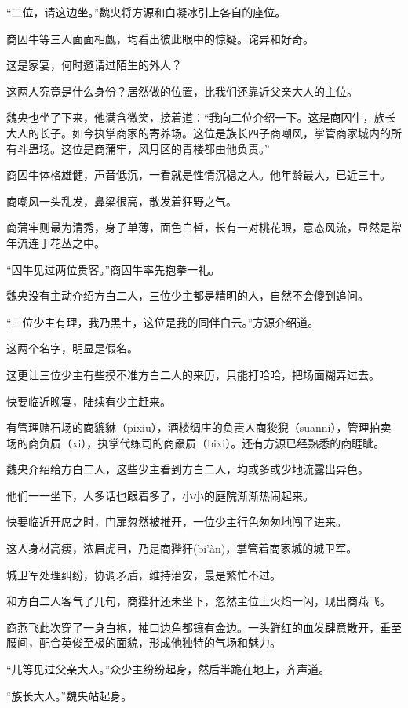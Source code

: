 \begin{this_body}
“二位，请这边坐。”魏央将方源和白凝冰引上各自的座位。

商囚牛等三人面面相觑，均看出彼此眼中的惊疑。诧异和好奇。

这是家宴，何时邀请过陌生的外人？

这两人究竟是什么身份？居然做的位置，比我们还靠近父亲大人的主位。

魏央也坐了下来，他满含微笑，接着道：“我向二位介绍一下。这是商囚牛，族长大人的长子。如今执掌商家的寄养场。这位是族长四子商嘲风，掌管商家城内的所有斗蛊场。这位是商蒲牢，风月区的青楼都由他负责。”

商囚牛体格雄健，声音低沉，一看就是性情沉稳之人。他年龄最大，已近三十。

商嘲风一头乱发，鼻梁很高，散发着狂野之气。

商蒲牢则最为清秀，身子单薄，面色白皙，长有一对桃花眼，意态风流，显然是常年流连于花丛之中。

“囚牛见过两位贵客。”商囚牛率先抱拳一礼。

魏央没有主动介绍方白二人，三位少主都是精明的人，自然不会傻到追问。

“三位少主有理，我乃黑土，这位是我的同伴白云。”方源介绍道。

这两个名字，明显是假名。

这更让三位少主有些摸不准方白二人的来历，只能打哈哈，把场面糊弄过去。

快要临近晚宴，陆续有少主赶来。

有管理赌石场的商貔貅（pixiu），酒楼绸庄的负责人商狻猊（suānni），管理拍卖场的商负屃（xi），执掌代练司的商赑屃（bixi）。还有方源已经熟悉的商睚眦。

魏央介绍给方白二人，这些少主看到方白二人，均或多或少地流露出异色。

他们一一坐下，人多话也跟着多了，小小的庭院渐渐热闹起来。

快要临近开席之时，门扉忽然被推开，一位少主行色匆匆地闯了进来。

这人身材高瘦，浓眉虎目，乃是商狴犴(bi’àn)，掌管着商家城的城卫军。

城卫军处理纠纷，协调矛盾，维持治安，最是繁忙不过。

和方白二人客气了几句，商狴犴还未坐下，忽然主位上火焰一闪，现出商燕飞。

商燕飞此次穿了一身白袍，袖口边角都镶有金边。一头鲜红的血发肆意散开，垂至腰间，配合英俊至极的面貌，形成他独特的气场和魅力。

“儿等见过父亲大人。”众少主纷纷起身，然后半跪在地上，齐声道。

“族长大人。”魏央站起身。


\end{this_body}
